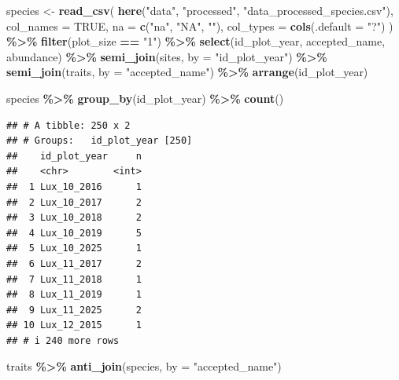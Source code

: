 \documentclass[
]{article}
\newenvironment{Shaded}{\begin{snugshade}}{\end{snugshade}}
\newcommand{\AttributeTok}[1]{\textcolor[rgb]{0.13,0.29,0.53}{#1}}
\newcommand{\ConstantTok}[1]{\textcolor[rgb]{0.56,0.35,0.01}{#1}}
\newcommand{\FunctionTok}[1]{\textcolor[rgb]{0.13,0.29,0.53}{\textbf{#1}}}
\newcommand{\NormalTok}[1]{#1}
\newcommand{\OtherTok}[1]{\textcolor[rgb]{0.56,0.35,0.01}{#1}}
\newcommand{\SpecialCharTok}[1]{\textcolor[rgb]{0.81,0.36,0.00}{\textbf{#1}}}
\newcommand{\StringTok}[1]{\textcolor[rgb]{0.31,0.60,0.02}{#1}}
\begin{document}
\begin{Shaded}
\begin{Highlighting}[]
\NormalTok{species }\OtherTok{\textless{}{-}} \FunctionTok{read\_csv}\NormalTok{(}
  \FunctionTok{here}\NormalTok{(}\StringTok{"data"}\NormalTok{, }\StringTok{"processed"}\NormalTok{, }\StringTok{"data\_processed\_species.csv"}\NormalTok{),}
  \AttributeTok{col\_names =} \ConstantTok{TRUE}\NormalTok{, }\AttributeTok{na =} \FunctionTok{c}\NormalTok{(}\StringTok{"na"}\NormalTok{, }\StringTok{"NA"}\NormalTok{, }\StringTok{""}\NormalTok{), }\AttributeTok{col\_types =} \FunctionTok{cols}\NormalTok{(}\AttributeTok{.default =} \StringTok{"?"}\NormalTok{)}
\NormalTok{  ) }\SpecialCharTok{\%\textgreater{}\%}
  \FunctionTok{filter}\NormalTok{(plot\_size }\SpecialCharTok{==} \StringTok{"1"}\NormalTok{) }\SpecialCharTok{\%\textgreater{}\%}
  \FunctionTok{select}\NormalTok{(id\_plot\_year, accepted\_name, abundance) }\SpecialCharTok{\%\textgreater{}\%}
  \FunctionTok{semi\_join}\NormalTok{(sites, }\AttributeTok{by =} \StringTok{"id\_plot\_year"}\NormalTok{) }\SpecialCharTok{\%\textgreater{}\%}
  \FunctionTok{semi\_join}\NormalTok{(traits, }\AttributeTok{by =} \StringTok{"accepted\_name"}\NormalTok{) }\SpecialCharTok{\%\textgreater{}\%}
  \FunctionTok{arrange}\NormalTok{(id\_plot\_year)}

\NormalTok{species }\SpecialCharTok{\%\textgreater{}\%}
  \FunctionTok{group\_by}\NormalTok{(id\_plot\_year) }\SpecialCharTok{\%\textgreater{}\%}
  \FunctionTok{count}\NormalTok{()}
\end{Highlighting}
\end{Shaded}

\begin{verbatim}
## # A tibble: 250 x 2
## # Groups:   id_plot_year [250]
##    id_plot_year     n
##    <chr>        <int>
##  1 Lux_10_2016      1
##  2 Lux_10_2017      2
##  3 Lux_10_2018      2
##  4 Lux_10_2019      5
##  5 Lux_10_2025      1
##  6 Lux_11_2017      2
##  7 Lux_11_2018      1
##  8 Lux_11_2019      1
##  9 Lux_11_2025      2
## 10 Lux_12_2015      1
## # i 240 more rows
\end{verbatim}

\begin{Shaded}
\begin{Highlighting}[]
\NormalTok{traits }\SpecialCharTok{\%\textgreater{}\%} \FunctionTok{anti\_join}\NormalTok{(species, }\AttributeTok{by =} \StringTok{"accepted\_name"}\NormalTok{)}
\end{Highlighting}
\end{Shaded}
\end{document}

